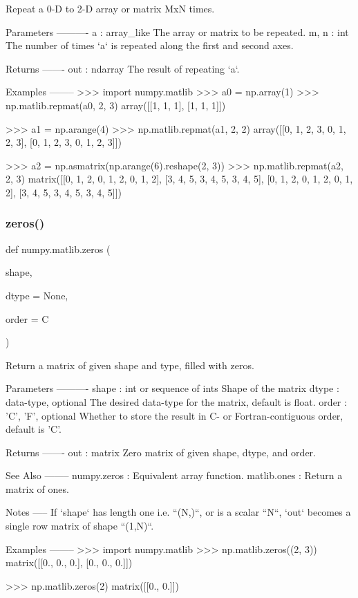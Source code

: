 \begin{DoxyVerb}Repeat a 0-D to 2-D array or matrix MxN times.

Parameters
----------
a : array_like
    The array or matrix to be repeated.
m, n : int
    The number of times `a` is repeated along the first and second axes.

Returns
-------
out : ndarray
    The result of repeating `a`.

Examples
--------
>>> import numpy.matlib
>>> a0 = np.array(1)
>>> np.matlib.repmat(a0, 2, 3)
array([[1, 1, 1],
       [1, 1, 1]])

>>> a1 = np.arange(4)
>>> np.matlib.repmat(a1, 2, 2)
array([[0, 1, 2, 3, 0, 1, 2, 3],
       [0, 1, 2, 3, 0, 1, 2, 3]])

>>> a2 = np.asmatrix(np.arange(6).reshape(2, 3))
>>> np.matlib.repmat(a2, 2, 3)
matrix([[0, 1, 2, 0, 1, 2, 0, 1, 2],
        [3, 4, 5, 3, 4, 5, 3, 4, 5],
        [0, 1, 2, 0, 1, 2, 0, 1, 2],
        [3, 4, 5, 3, 4, 5, 3, 4, 5]])\end{DoxyVerb}
 \mbox{\label{namespacenumpy_1_1matlib_a60e275620ed434de08d9b32661bf72a4}} 
\subsubsection{\texorpdfstring{zeros()}{zeros()}}
{\footnotesize\ttfamily def numpy.\+matlib.\+zeros (\begin{DoxyParamCaption}\item[{}]{shape,  }\item[{}]{dtype = {\ttfamily None},  }\item[{}]{order = {\ttfamily \textquotesingle{}C\textquotesingle{}} }\end{DoxyParamCaption})}

\begin{DoxyVerb}Return a matrix of given shape and type, filled with zeros.

Parameters
----------
shape : int or sequence of ints
    Shape of the matrix
dtype : data-type, optional
    The desired data-type for the matrix, default is float.
order : {'C', 'F'}, optional
    Whether to store the result in C- or Fortran-contiguous order,
    default is 'C'.

Returns
-------
out : matrix
    Zero matrix of given shape, dtype, and order.

See Also
--------
numpy.zeros : Equivalent array function.
matlib.ones : Return a matrix of ones.

Notes
-----
If `shape` has length one i.e. ``(N,)``, or is a scalar ``N``,
`out` becomes a single row matrix of shape ``(1,N)``.

Examples
--------
>>> import numpy.matlib
>>> np.matlib.zeros((2, 3))
matrix([[0.,  0.,  0.],
        [0.,  0.,  0.]])

>>> np.matlib.zeros(2)
matrix([[0.,  0.]])\end{DoxyVerb}
 

